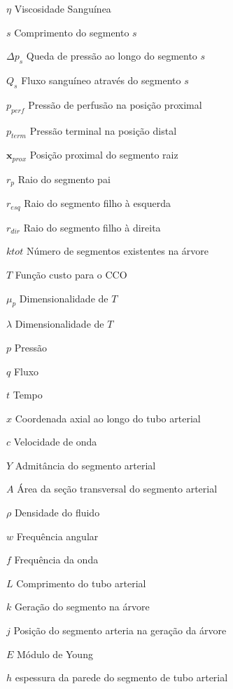 \documentclass[
        english,			
        brazil			        %
        ,<...>]{abntbibufjf}
\begin{document}
\begin{simbolos} %
\item [$\eta$] Viscosidade Sanguínea 
\item [$s$] Comprimento do segmento $s$
\item [$\Delta p_s$] Queda de pressão ao longo do segmento $s$
\item [$Q_s$] Fluxo sanguíneo através do segmento $s $
\item [$p_{perf}$] Pressão de perfusão na posição proximal 
\item [$p_{term}$] Pressão terminal na posição distal
\item [$\mathbf{x}_{prox}$] Posição proximal do segmento raiz 
\item [$r_p$] Raio do segmento pai
\item [$r_{esq}$] Raio do segmento filho à esquerda
\item [$r_{dir}$] Raio do segmento filho à direita
\item [$ktot$] Número de segmentos existentes na árvore
\item [$T$] Função custo para o CCO
\item [$\mu_p$] Dimensionalidade de $T$
\item [$\lambda$] Dimensionalidade de $T$
\item [$p$] Pressão
\item [$q$] Fluxo
\item [$t$] Tempo
\item [$x$] Coordenada axial ao longo do tubo arterial
\item [$c$] Velocidade de onda
\item [$Y$] Admitância do segmento arterial
\item [$A$] Área da seção transversal do segmento arterial
\item [$\rho$] Densidade do fluido
\item [$w$] Frequência angular
\item [$f$] Frequência da onda
\item [$L$] Comprimento do tubo arterial
\item [$k$] Geração do segmento na árvore
\item [$j$] Posição do segmento arteria na geração da árvore
\item [$E$] Módulo de Young
\item [$h$] espessura da parede do segmento de tubo arterial

\end{simbolos}
\end{document}
